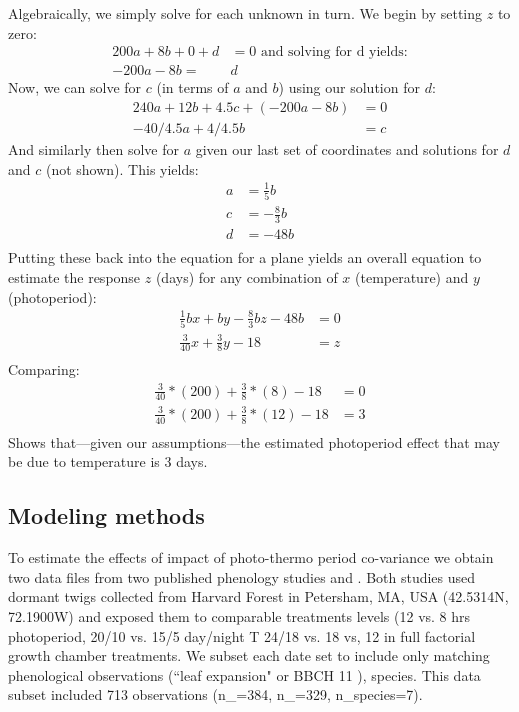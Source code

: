 \documentclass[11pt]{article}
\begin{document}
Algebraically, we simply solve for each unknown in turn. We begin by setting $z$ to zero:
\begin{align}
200a + 8b + 0 + d & = 0 \text{ and solving for d yields:} \\
-200a - 8b = & d  %
\end{align}
Now, we can solve for $c$ (in terms of $a$ and $b$) using our solution for $d$:
\begin{align}
240a+12b+4.5c+(-200a - 8b) &=0\\
-40/4.5a+4/4.5b & = c%
\end{align}
And similarly then solve for $a$ given our last set of coordinates and solutions for $d$ and $c$ (not shown). This yields:
\begin{align}
a & =\frac{1}{5}b\\
c & =-\frac{8}{3}b\\
d & =-48b\\
\end{align}
Putting these back into the equation for a plane yields an overall equation to estimate the response $z$ (days) for any combination of $x$ (temperature) and $y$ (photoperiod):
\begin{align}
\frac{1}{5}bx + by -\frac{8}{3}bz -48b&=0\\
\frac{3}{40}x + \frac{3}{8}y-18 & = z\\
\end{align}
Comparing:
\begin{align}
\frac{3}{40}*(200) + \frac{3}{8}*(8)-18 &=0\\ 
\frac{3}{40}*(200) + \frac{3}{8}*(12)-18 &=3\\ 
\end{align}
Shows that---given our assumptions---the estimated photoperiod effect that may be due to temperature is 3 days. 


\subsection*{Modeling methods}
To estimate the effects of impact of photo-thermo period co-variance we obtain two data files from two published phenology studies \cite{Flynn2018} and \cite{Buonaiuto:2021ug}. Both studies used dormant twigs collected from Harvard Forest in Petersham, MA, USA (42.5314\degree N, 72.1900\degree W)  and exposed them to comparable treatments levels (12 vs. 8 hrs photoperiod, 20/10 vs. 15/5 day/night T \citep{Flynn2018} 24/18 vs. 18 vs, 12 \citep{Buonaiuto:2021ug} in full factorial growth chamber treatments. We subset each date set to include only matching phenological observations (``leaf expansion" or BBCH 11 \citep{Finn2007}), species. This data subset included 713 observations (n_{\cite{Flynn2018}}=384, n_{\cite{Buonaiuto:2021ug}}=329, n_{species}=7).
\end{document}
